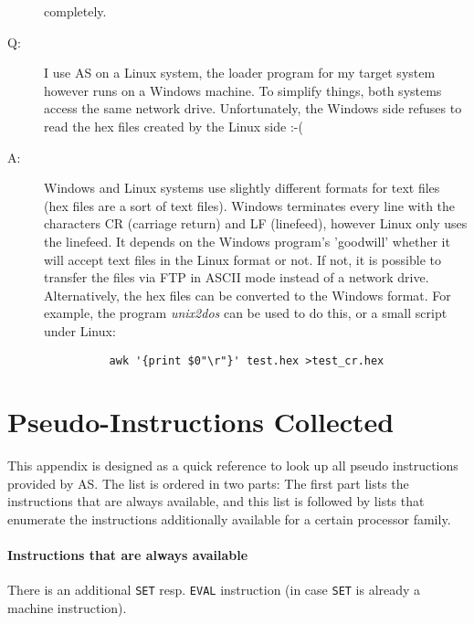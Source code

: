 \documentclass[12pt,twoside]{report}
\newcommand{\tty}[1]{{\tt #1}}
\begin{document}
\begin{description}
{   completely.}
\item[Q:]{I use AS on a Linux system, the loader program for my target 
          system however runs on a Windows machine. To simplify things,
          both systems access the same network drive.  Unfortunately, the
          Windows side refuses to read the hex files created by the Linux
          side :-(}
\item[A:]{Windows and Linux systems use slightly different formats for
          text files (hex files are a sort of text files).  Windows
          terminates every line with the characters CR (carriage return)
          and LF (linefeed), however Linux only uses the linefeed.  It
          depends on the Windows program's 'goodwill' whether it will
          accept text files in the Linux format or not.  If not, it is
          possible to transfer the files via FTP in ASCII mode instead
          of a network drive.  Alternatively, the hex files can be 
          converted to the Windows format.  For example, the program
          {\em unix2dos} can be used to do this, or a small script under
          Linux:
          \begin{verbatim}
          awk '{print $0"\r"}' test.hex >test_cr.hex
          \end{verbatim}}
\end{description}


\cleardoublepage
\chapter{Pseudo-Instructions Collected}

This appendix is designed as a quick reference to look up all pseudo
instructions provided by AS.  The list is ordered in two parts: The
first part lists the instructions that are always available, and this
list is followed by lists that enumerate the instructions
additionally available for a certain processor family.

\subsubsection{Instructions that are always available}

There is an additional \tty{SET} resp. \tty{EVAL} instruction (in case
\tty{SET} is already a machine instruction).


\end{document}
